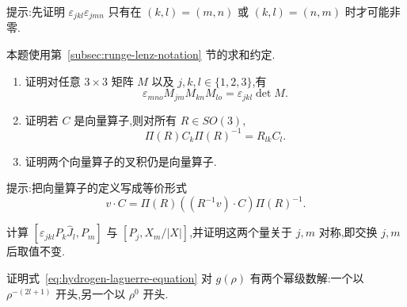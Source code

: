 {\begin{exercise}
提示:先证明 $\varepsilon_{jkl}\varepsilon_{jmn}$ 只有在 $(k,l)=(m,n)$ 或 $(k,l)=(n,m)$ 时才可能非零.
\end{exercise}

\begin{exercise}[向量算子叉积的变换性质]\label{ex:vector-operator-cross-product}
本题使用第~\ref{subsec:runge-lenz-notation} 节的求和约定.
\begin{enumerate}
\item 证明对任意 $3\times3$ 矩阵 $M$ 以及 $j,k,l\in\{1,2,3\}$,有
\[
 \varepsilon_{mno}M_{jm}M_{kn}M_{lo}=\varepsilon_{jkl}\det M.
\]
\item 证明若 $C$ 是向量算子,则对所有 $R\in SO(3)$,
\[
 \Pi(R)C_k\Pi(R)^{-1}=R_{lk}C_l.
\]
\item 证明两个向量算子的叉积仍是向量算子.
\end{enumerate}
提示:把向量算子的定义写成等价形式
\[
 v\cdot C=\Pi(R)((R^{-1}v)\cdot C)\Pi(R)^{-1}.
\]
\end{exercise}

\begin{exercise}[对称交换子计算]\label{ex:runge-lenz-symmetric-commutators}
计算 $[\varepsilon_{jkl}P_k\widehat J_l,P_m]$ 与 $[P_j,X_m/|X|]$,并证明这两个量关于 $j,m$ 对称,即交换 $j,m$ 后取值不变.
\end{exercise}

\begin{exercise}[径向方程的两个幂级数解]\label{ex:hydrogen-radial-power-series}
证明式~\eqref{eq:hydrogen-laguerre-equation} 对 $g(\rho)$ 有两个幂级数解:一个以 $\rho^{-(2l+1)}$ 开头,另一个以 $\rho^0$ 开头.
\end{exercise}
}

